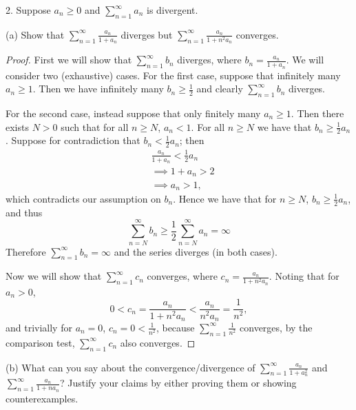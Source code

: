 \documentclass{article}
\begin{document}
\newpage

2. Suppose $a_n \geq 0$ and $\sum_{n = 1}^\infty a_n$ is divergent.

(a) Show that $\sum_{n = 1}^\infty \frac{a_n}{1 + a_n}$ diverges but
$\sum_{n = 1}^\infty \frac{a_n}{1 + n^2 a_n}$ converges.

\begin{proof}

First we will show that $\sum_{n = 1}^\infty b_n$ diverges, where $b_n =
\frac{a_n}{1 + a_n}$. We will consider two (exhaustive) cases. For the
first case, suppose that infinitely many $a_n \geq 1$. Then we have
infinitely many $b_n \geq \frac{1}{2}$ and clearly $\sum_{n =
1}^\infty b_n$ diverges.

For the second case, instead suppose that only finitely many $a_n \geq
1$. Then there exists $N > 0$ such that for all $n \geq N$, $a_n < 1$.
For all $n \geq N$ we have that $b_n \geq \frac{1}{2} a_n$. Suppose for
contradiction that $b_n < \frac{1}{2} a_n$; then
%
\begin{align*}
    &\frac{a_n}{1 + a_n} < \frac{1}{2} a_n \\
    &\implies 1 + a_n > 2 \\
    &\implies a_n > 1
    ,
\end{align*}
%
which contradicts our assumption on $b_n$. Hence we have that for $n
\geq N$, $b_n \geq \frac{1}{2} a_n$, and thus
%
\begin{equation*}
    \sum_{n = N}^\infty b_n \geq \frac{1}{2} \sum_{n = N}^\infty a_n = \infty
\end{equation*}
%
Therefore $\sum_{n = 1}^\infty b_n = \infty$ and the series diverges (in
both cases).

Now we will show that $\sum_{n = 1}^\infty c_n$ converges, where $c_n
= \frac{a_n}{1 + n^2 a_n}$. Noting that for $a_n > 0$,
%
\begin{equation*}
    0 < c_n = \frac{a_n}{1 + n^2 a_n} < \frac{a_n}{n^2 a_n} = \frac{1}{n^2}
    ,
\end{equation*}
%
and trivially for $a_n = 0$, $c_n = 0 < \frac{1}{n^2}$, because $\sum_{n
= 1}^\infty \frac{1}{n^2}$ converges, by the comparison test, $\sum_{n =
1}^\infty c_n$ also converges.

\end{proof}

(b) What can you say about the convergence/divergence of $\sum_{n =
1}^\infty \frac{a_n}{1 + a_n^2}$ and $\sum_{n = 1}^\infty \frac{a_n}{1 +
n a_n}$? Justify your claims by either proving them or showing
counterexamples.
\end{document}
